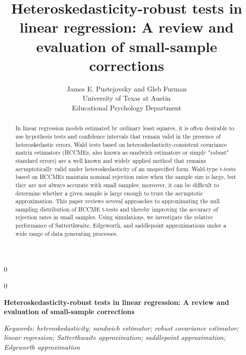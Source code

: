 \documentclass[12pt]{article}\usepackage[]{graphicx}\usepackage[]{color}
\newcommand{\blind}{0}
\newcommand{\MyTitle}{Heteroskedasticity-robust tests in linear regression: A review and evaluation of small-sample corrections}
\begin{document}
%

\def\spacingset#1{\renewcommand{\baselinestretch}%
{#1}\small\normalsize} \spacingset{1}



\blind
{
  \title{\bf \MyTitle}
  \author{James E. Pustejovsky and Gleb Furman \\
    University of Texas at Austin \\
    Educational Psychology Department}
  \maketitle
} \fi

\blind
{
  \bigskip
  \bigskip
  \bigskip
  \begin{center}
    {\LARGE\bf \MyTitle}
\end{center}
  \medskip
} \fi

\bigskip
\begin{abstract}
In linear regression models estimated by ordinary least squares, it is often desirable to use hypothesis tests and confidence intervals that remain valid in the presence of heteroskedastic errors. 
Wald tests based on heteroskedasticity-consistent covariance matrix estimators (HCCMEs, also known as sandwich estimators or simply "robust" standard errors) are a well known and widely applied method that remains asymptotically valid under heteroskedasticity of an unspecified form.
Wald-type t-tests based on HCCMEs maintain nominal rejection rates when the sample size is large, but they are not always accurate with small samples; moreover, it can be difficult to determine whether a given sample is large enough to trust the asymptotic approximation.
This paper reviews several approaches to approximating the null sampling distribution of HCCME t-tests and thereby improving the accuracy of rejection rates in small samples.
Using simulations, we investigate the relative performance of Satterthwaite, Edgeworth, and saddlepoint approximations under a wide range of data generating processes. 
\end{abstract}

\noindent%
{\it Keywords: heteroskedasticity; sandwich estimator; robust covariance estimator; linear regression; Satterthwaite approximation; saddlepoint approximation; Edgeworth approximation} 
\vfill

\newpage
\spacingset{1.45} %
\end{document}
